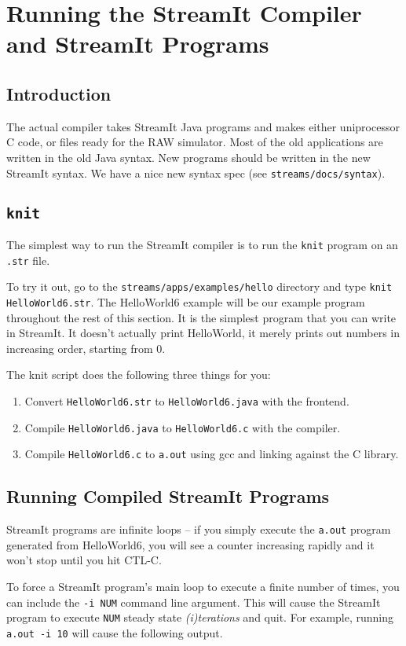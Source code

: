 \section{Running the StreamIt Compiler and StreamIt Programs}

\subsection{Introduction}
The actual compiler takes StreamIt Java programs and makes either 
uniprocessor C code, or files ready for the RAW simulator. Most
of the old applications are written in the old Java syntax. 
New programs should be written in the new StreamIt syntax.
We have a nice new syntax spec (see {\tt streams/docs/syntax}).


\subsection{{\tt knit}}
The simplest way to run the StreamIt compiler is to run the 
{\tt knit} program on an {\tt .str} file. 

To try it out, go to the {\tt streams/apps/examples/hello}
directory and type {\tt knit HelloWorld6.str}. The HelloWorld6 example
will be our example program throughout the rest of this section. 
It is the simplest program that you can write in StreamIt. It doesn't
actually print HelloWorld, it merely prints out numbers in
increasing order, starting from 0.

The knit script does the following three things for you:
\begin{enumerate}
  \item Convert {\tt HelloWorld6.str} to {\tt HelloWorld6.java} with the frontend.
  \item Compile {\tt HelloWorld6.java} to {\tt HelloWorld6.c} with the compiler.
  \item Compile {\tt HelloWorld6.c} to {\tt a.out} using gcc and linking against the C library.
\end{enumerate}

\subsection{Running Compiled StreamIt Programs}
StreamIt programs are infinite loops -- if you simply execute the {\tt a.out} 
program generated from HelloWorld6, you will see a counter increasing 
rapidly and it won't stop until you hit CTL-C.

To force a StreamIt program's main loop to execute a finite number
of times, you can include the {\tt -i NUM} command line argument.
This will cause the StreamIt program to execute {\tt NUM} steady state
{\it (i)terations} and quit. For example, running {\tt a.out -i 10} will 
cause the following output.

